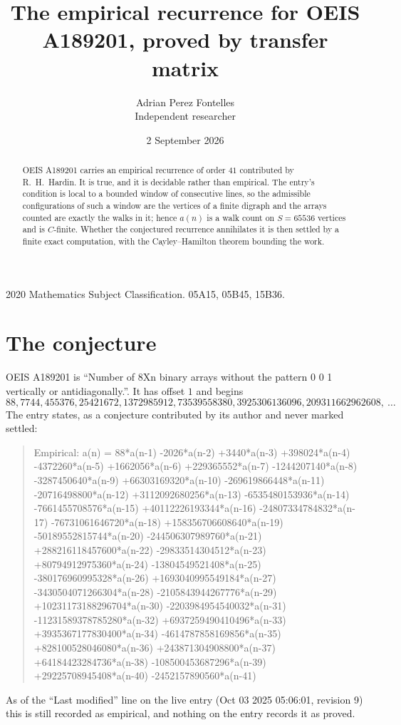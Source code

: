 \documentclass[11pt,a4paper]{article}
\title{The empirical recurrence for OEIS A189201, proved by transfer matrix}
\author{Adrian Perez Fontelles\\ \small Independent researcher}
\date{2 September 2026}
\theoremstyle{plain}
\theoremstyle{definition}
\begin{document}
\maketitle

\begin{abstract}
OEIS A189201 carries an empirical recurrence of order $41$ contributed by R.~H.~Hardin. It is
true, and it is decidable rather than empirical. The entry's condition is local to a bounded window of consecutive lines, so
the admissible configurations of such a window are the vertices of a finite digraph and the
arrays counted are exactly the walks in it; hence $a(n)$ is a walk count on $S=65536$ vertices
and is $C$-finite. Whether the conjectured recurrence annihilates it is then settled by a
finite exact computation, with the Cayley--Hamilton theorem bounding the work.
\end{abstract}

\noindent\small 2020 Mathematics Subject Classification. 05A15, 05B45, 15B36.\normalsize

\section{The conjecture}

OEIS A189201 is ``Number of 8Xn binary arrays without the pattern 0 0 1 vertically or antidiagonally.''. It has offset $1$ and begins
\[
88, 7744, 455376, 25421672, 1372985912, 73539558380, 3925306136096, 209311662962608,\ \dots
\]
The entry states, as a conjecture contributed by its author and never marked settled:
\begin{quote}
Empirical: a(n) = 88*a(n-1) -2026*a(n-2) +3440*a(n-3) +398024*a(n-4) -4372260*a(n-5) +1662056*a(n-6) +229365552*a(n-7) -1244207140*a(n-8) -3287450640*a(n-9) +66303169320*a(n-10) -269619866448*a(n-11) -20716498800*a(n-12) +3112092680256*a(n-13) -6535480153936*a(n-14) -7661455708576*a(n-15) +40112226193344*a(n-16) -24807334784832*a(n-17) -76731061646720*a(n-18) +158356706608640*a(n-19) -50189552815744*a(n-20) -244506307989760*a(n-21) +288216118457600*a(n-22) -29833514304512*a(n-23) +80794912975360*a(n-24) -13804549521408*a(n-25) -380176960995328*a(n-26) +1693040995549184*a(n-27) -3430504071266304*a(n-28) -2105843944267776*a(n-29) +10231173188296704*a(n-30) -2203984954540032*a(n-31) -11231589378785280*a(n-32) +6937259490410496*a(n-33) +3935367177830400*a(n-34) -4614787858169856*a(n-35) +828100528046080*a(n-36) +243871304908800*a(n-37) +64184423284736*a(n-38) -108500453687296*a(n-39) +29225708945408*a(n-40) -2452157890560*a(n-41)
\end{quote}
As of the ``Last modified'' line on the live entry (Oct 03 2025 05:06:01, revision 9) this is still
recorded as empirical, and nothing on the entry records it as proved.
\end{document}
